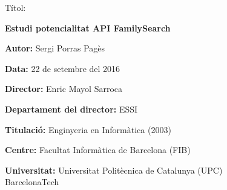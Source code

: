 \begin{titlepage}
    \begin{center}
        \vspace{0.5cm}
        \LARGE
        Títol:\par
        \Huge
        \textbf{Estudi potencialitat API FamilySearch}
        \par\vspace{1.5cm}

        \LARGE
        \textbf{Autor:} Sergi Porras Pagès
        \par\vspace{0.75cm}

        \Large
        \textbf{Data:} 22 de setembre del 2016
        \par\vfill

        \Large
        \textbf{Director:} Enric Mayol Sarroca
        \par

        \Large
        \textbf{Departament del director:} ESSI
        \par\vspace{0.5cm}

        \Large
        \textbf{Titulació:} Enginyeria en Informàtica (2003)
        \par\vspace{0.5cm}

        \Large
        \textbf{Centre:} Facultat Informàtica de Barcelona (FIB)
        \par

        \Large
        \textbf{Universitat:} Universitat Politècnica de Catalunya (UPC)\\
        BarcelonaTech\hspace{3.12cm}
        \par

    \end{center}

\end{titlepage}

